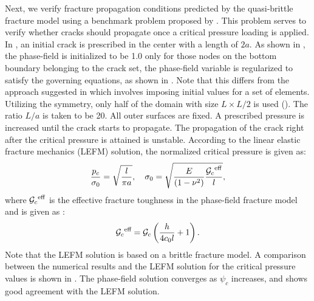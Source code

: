 Next, we verify fracture propagation conditions predicted by the quasi-brittle fracture model using a benchmark problem proposed by \citet{WILSON2016264}. This problem serves to verify whether cracks should propagate once a critical pressure loading is applied. In , an initial crack is prescribed in the center with a length of $2a$. As shown in , the phase-field is initialized to be 1.0 only for those nodes on the bottom boundary belonging to the crack set, the phase-field variable is regularized to satisfy the governing equations, as shown in . Note that this differs from the approach suggested in \cite{WILSON2016264,YOSHIOKA2020113210} which involves imposing initial values for a set of elements.
Utilizing the symmetry, only half of the domain with size $L \times L/2$ is used (). The ratio $L/a$ is taken to be 20. All outer surfaces are fixed. A prescribed pressure is increased until the crack starts to propagate. The propagation of the crack right after the critical pressure is attained is unstable. According to the linear elastic fracture mechanics (LEFM) solution, the normalized critical pressure is given as:
\begin{equation}
  \dfrac{p_c}{\sigma_0} = \sqrt{\dfrac{l}{\pi a}}, \quad \sigma_0=\sqrt{\dfrac{E}{(1-\nu^2)} \dfrac{{\mathcal{G}_c}^\text{eff}}{l}},
\end{equation}
where ${\mathcal{G}_c}^\text{eff}$ is the effective fracture toughness in the phase-field fracture model and is given as \cite{Bourding2008,YOSHIOKA2020113210}:
\begin{equation}
  {\mathcal{G}_c}^\text{eff} = {\mathcal{G}_c}\left(\dfrac{h}{4c_0l}+1\right).
\end{equation}
Note that the LEFM solution is based on a brittle fracture model. A comparison between the numerical results and the LEFM solution for the critical pressure values is shown in . The phase-field solution converges as $\psi_c$ increases, and shows good agreement with the LEFM solution.

